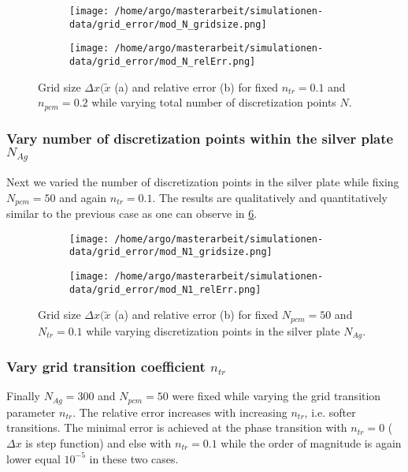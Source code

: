 \documentclass{scrartcl}[12pt, halfparskip]
\numberwithin{equation}{section}
\numberwithin{figure}{section}
\numberwithin{table}{section}
\begin{document}
\begin{figure}[H]
	\begin{subfigure}{0.49\textwidth}
		\texttt{[image: /home/argo/masterarbeit/simulationen-data/grid\_error/mod\_N\_gridsize.png]}
		\caption{}
		\label{fig:gridsize_mod_N}
	\end{subfigure}
	\begin{subfigure}{0.49\textwidth}
		\texttt{[image: /home/argo/masterarbeit/simulationen-data/grid\_error/mod\_N\_relErr.png]}
		\caption{}
		\label{fig:grid_relErr_mod_N}
	\end{subfigure}
	\caption{Grid size $\Delta x(\tilde{x}$ (a) and relative error (b) for fixed $n_{tr}=0.1$ and $n_{pcm}=0.2$ while varying total number of discretization points $N$.}
	\label{fig:grid_mod_N}
\end{figure}

\subsubsection{Vary number of discretization points within the silver plate $N_{Ag}$}
Next we varied the number of discretization points in the silver plate while fixing $N_{pcm}=50$ and again $n_{tr}=0.1$. The results are qualitatively and quantitatively similar to the previous case as one can observe in \cref{fig:grid_mod_N1}.


\begin{figure}[H]
	\begin{subfigure}{0.49\textwidth}
		\texttt{[image: /home/argo/masterarbeit/simulationen-data/grid\_error/mod\_N1\_gridsize.png]}
		\caption{}
		\label{fig:gridsize_mod_N1}
	\end{subfigure}
	\begin{subfigure}{0.49\textwidth}
		\texttt{[image: /home/argo/masterarbeit/simulationen-data/grid\_error/mod\_N1\_relErr.png]}
		\caption{}
		\label{fig:grid_relErr_mod_N1}
	\end{subfigure}
	\caption{Grid size $\Delta x(\tilde{x}$ (a) and relative error (b) for fixed $N_{pcm}=50$ and $N_{tr}=0.1$ while varying discretization points in the silver plate $N_{Ag}$.}
	\label{fig:grid_mod_N1}
\end{figure}


\subsubsection{Vary grid transition coefficient $n_{tr}$}
Finally $N_{Ag}=300$ and $N_{pcm}=50$ were fixed while varying the grid transition parameter $n_{tr}$. The relative error increases with increasing $n_{tr}$, i.e. softer transitions. The minimal error is achieved at the phase transition with $n_{tr}=0$ ($\Delta x$ is step function) and else with $n_{tr}=0.1$ while the order of magnitude is again lower equal $10^{-5}$ in these two cases.
\end{document}
